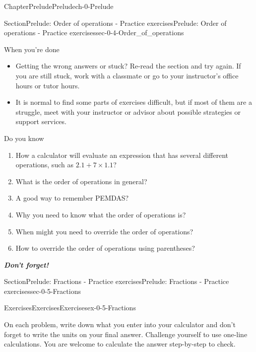 \documentclass[twoside,11pt,]{book}
\newcommand{\alert}[1]{\textbf{\textit{#1}}}
\numberwithin{equation}{section}
\begin{document}
\begin{chapterptx}{Chapter}{Prelude}{}{Prelude}{}{}{ch-0-Prelude}
\begin{sectionptx}{Section}{Prelude: Order of operations - Practice exercises}{}{Prelude: Order of operations - Practice exercises}{}{}{sec-0-4-Order_of_operations}
\begin{conclusion}{When you're done \textellipsis{}}
\begin{itemize}[label=\textbullet]
\item{}Getting the wrong answers or stuck? Re-read the section and try again. If you are still stuck, work with a classmate or go to your instructor's office hours or tutor hours.%
\item{}It is normal to find some parts of exercises difficult, but if most of them are a struggle, meet with your instructor or advisor about possible strategies or support services.%
\end{itemize}
%
\end{conclusion}%
\begin{conclusion}{Do you know \textellipsis{}}%
%
\begin{enumerate}[label={\Alph*.}]
\item{}How a calculator will evaluate an expression that has several different operations, such as \(2.1 + 7 \times 1.1\)?%
\item{}What is the order of operations in general?%
\item{}A good way to remember PEMDAS?%
\item{}Why you need to know what the order of operations is?%
\item{}When might you need to override the order of operations?%
\item{}How to override the order of operations using parentheses?%
\end{enumerate}
%
\par
\alert{Don't forget!}%
\end{conclusion}%
\end{sectionptx}
%
%
\typeout{************************************************}
\typeout{************************************************}
%
\begin{sectionptx}{Section}{Prelude: Fractions - Practice exercises}{}{Prelude: Fractions - Practice exercises}{}{}{sec-0-5-Fractions}
%
%
\typeout{************************************************}
\typeout{************************************************}
%
\begin{exercises-subsection-numberless}{Exercises}{Exercises}{}{Exercises}{}{}{ex-0-5-Fractions}
\begin{introduction}{}%
On each problem, write down what you enter into your calculator and don't forget to write the units on your final answer. Challenge yourself to use one-line calculations. You are welcome to calculate the answer step-by-step to check.%
\end{introduction}%

\end{exercises-subsection-numberless}
\end{sectionptx}
\end{chapterptx}
\end{document}
